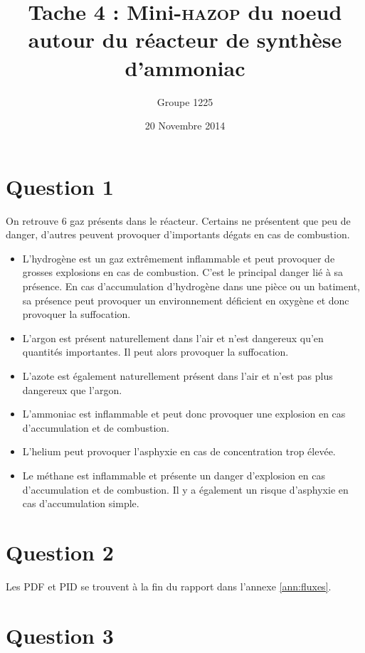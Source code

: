 \documentclass[a4paper,oneside,12pt]{article}
\title{Tache 4 : Mini-\textsc{hazop} du noeud autour du réacteur de synthèse d'ammoniac}
\author{Groupe 1225}
\date{20 Novembre 2014}
\begin{document}
\maketitle

\section*{Question 1}

On retrouve $6$ gaz présents dans le réacteur. 
Certains ne présentent que peu de danger, 
d'autres peuvent provoquer d'importants dégats en cas de combustion.

\begin{itemize}	
	\item L'hydrogène est un gaz extrêmement inflammable et peut provoquer de grosses 
		explosions en cas de combustion. C'est le principal danger lié à sa présence. 
		En cas d'accumulation d'hydrogène dans une pièce ou un batiment, 
		sa présence peut provoquer un environnement déficient en oxygène et 
		donc provoquer la suffocation.

	\item  L'argon est présent naturellement dans l'air et n'est dangereux qu'en 
		quantités importantes. Il peut alors provoquer la suffocation.

	\item  L'azote est également naturellement présent dans l'air et n'est pas plus 
		dangereux que l'argon.

	\item  L'ammoniac est inflammable et peut donc provoquer une explosion en cas 
		d'accumulation et de combustion.

	\item  L'helium peut provoquer l'asphyxie en cas de concentration trop élevée.

	\item  Le méthane est inflammable et présente un danger d'explosion en cas 
		d'accumulation et de combustion. Il y a également un risque d'asphyxie en 
		cas d'accumulation simple.
\end{itemize}

\section*{Question 2}

Les PDF et PID se trouvent à la fin du rapport dans l'annexe \ref{ann:fluxes}.


\section*{Question 3}
\end{document}
